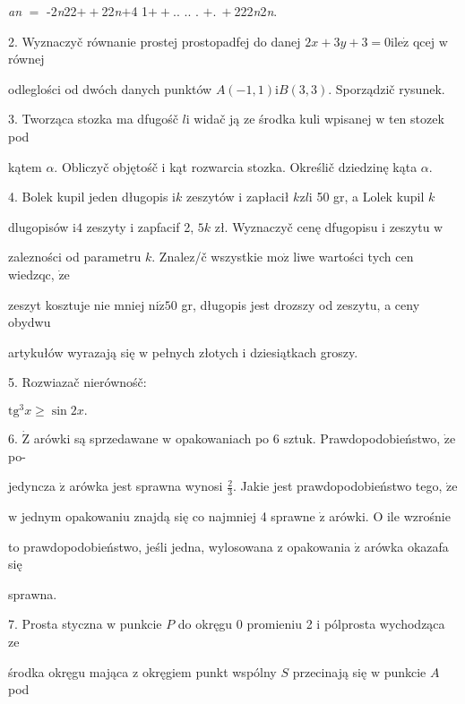 \documentclass[a4paper,12pt]{article}
\begin{document}
{\it an} $=$ -2{\it n}22$++$22{\it n}$+$4 1$++$.. .. . $+.\ +$222{\it n}2{\it n}.

2. Wyznaczyč równanie prostej prostopadfej do danej $2x+3y+3=0\mathrm{i}\mathrm{l}\mathrm{e}\dot{\mathrm{z}}$ qcej $\mathrm{w}$ równej

odleglości od dwóch danych punktów $A(-1,1)\mathrm{i}B(3,3)$. Sporządzič rysunek.

3. Tworząca stozka ma dfugośč $l\mathrm{i}$ widač ją ze środka kuli wpisanej $\mathrm{w}$ ten stozek pod

kątem $\alpha$. Obliczyč objętośč $\mathrm{i}$ kąt rozwarcia stozka. Określič dziedzinę kąta $\alpha.$

4. Bolek kupil jeden długopis $\mathrm{i} k$ zeszytów $\mathrm{i}$ zapłacił $k\mathrm{z}l\mathrm{i}$ 50 gr, a Lolek kupil $k$

dlugopisów $\mathrm{i} 4$ zeszyty $\mathrm{i}$ zapfacif 2, $5k$ zł. Wyznaczyč cenę dfugopisu $\mathrm{i}$ zeszytu $\mathrm{w}$

zalezności od parametru $k$. Znalez/č wszystkie $\mathrm{m}\mathrm{o}\dot{\mathrm{z}}$ liwe wartości tych cen wiedzqc, $\dot{\mathrm{z}}\mathrm{e}$

zeszyt kosztuje nie mniej $\mathrm{n}\mathrm{i}\dot{\mathrm{z}} 50$ gr, długopis jest drozszy od zeszytu, a ceny obydwu

artykułów wyrazają się $\mathrm{w}$ pełnych złotych $\mathrm{i}$ dziesiątkach groszy.

5. Rozwiazač nierównośč:

$\mathrm{t}\mathrm{g}^{3}x\geq\sin 2x.$

6. $\dot{\mathrm{Z}}$ arówki są sprzedawane $\mathrm{w}$ opakowaniach po 6 sztuk. Prawdopodobieństwo, $\dot{\mathrm{z}}\mathrm{e}$ po-

jedyncza $\dot{\mathrm{z}}$ arówka jest sprawna wynosi $\displaystyle \frac{2}{3}$. Jakie jest prawdopodobieństwo tego, $\dot{\mathrm{z}}\mathrm{e}$

$\mathrm{w}$ jednym opakowaniu znajdą się co najmniej 4 sprawne $\dot{\mathrm{z}}$ arówki. $\mathrm{O}$ ile wzrośnie

to prawdopodobieństwo, jeśli jedna, wylosowana $\mathrm{z}$ opakowania $\dot{\mathrm{z}}$ arówka okazafa się

sprawna.

7. Prosta styczna $\mathrm{w}$ punkcie $P$ do okręgu $0$ promieniu 2 $\mathrm{i}$ pólprosta wychodząca ze

środka okręgu mająca $\mathrm{z}$ okręgiem punkt wspólny $S$ przecinają się $\mathrm{w}$ punkcie $A$ pod
\end{document}
